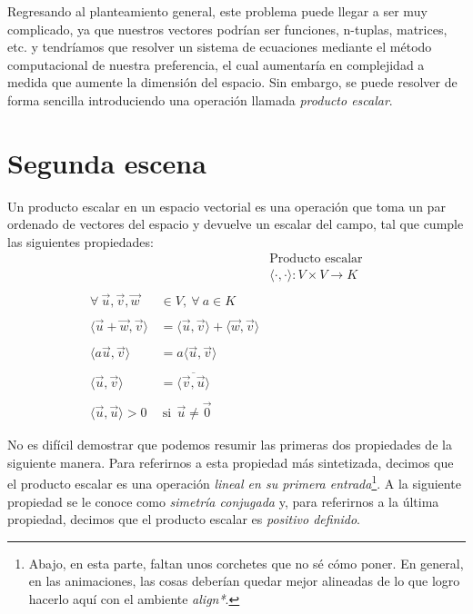 \documentclass[12pt,dvipsnames]{article}
\numberwithin{equation}{section}
\begin{document}
Regresando al planteamiento general, este problema puede llegar a ser muy complicado, ya que nuestros vectores podrían ser funciones, n-tuplas, matrices, etc. y tendríamos que resolver un sistema de ecuaciones \textemdash mediante el método computacional de nuestra preferencia\textemdash, el cual aumentaría en complejidad a medida que aumente la dimensión del espacio. Sin embargo, se puede resolver de forma sencilla introduciendo una operación llamada \emph{producto escalar}.


\newpage
\section{Segunda escena}

Un producto escalar en un espacio vectorial es una operación que toma un par ordenado de vectores del espacio y devuelve un escalar del campo, tal que cumple las siguientes propiedades:
\begin{align*}
    & &\text{Producto escalar}& &\\
    & &\langle\cdot,\cdot\rangle:V\times V\to K & &\\
    \\
    \forall \ \vec{u}, \vec{v}, \vec{w}&\in V, \ \forall \ a\in K\\
    \\
    \langle\vec{u}+\vec{w},\vec{v}\rangle &= \langle \vec{u} , \vec{v} \rangle + \langle \vec{w} , \vec{v} \rangle \\
    \\
    \langle a\vec{u} , \vec{v} \rangle &= a \langle \vec{u} , \vec{v} \rangle\\
    \\
    \langle \vec{u} , \vec{v} \rangle &= \overline{ \langle \vec{v} , \vec{u} \rangle}\\
    \\
    \langle \vec{u}, \vec{u} \rangle > 0 \ &\ \text{si} \ \ \vec{u}\neq\vec{0}
\end{align*}

\noindent No es difícil demostrar que podemos resumir las primeras dos propiedades de la siguiente manera. Para referirnos a esta propiedad más sintetizada, decimos que el producto escalar es una operación \emph{lineal en su primera entrada}\footnote{Abajo, en esta parte, faltan unos corchetes que no sé cómo poner. En general, en las animaciones, las cosas deberían quedar mejor alineadas de lo que logro hacerlo aquí con el ambiente \emph{align*}.}. A la siguiente propiedad se le conoce como \emph{simetría conjugada} y, para referirnos a la última propiedad, decimos que el producto escalar es \emph{positivo definido}.
\end{document}
